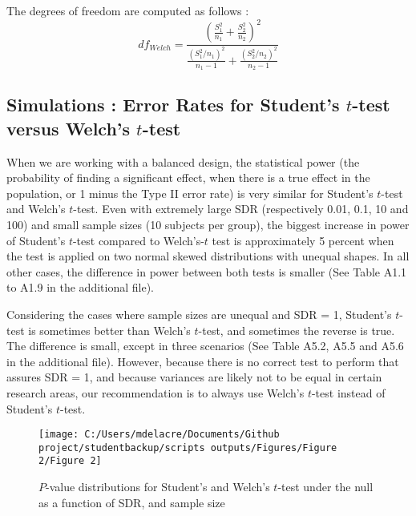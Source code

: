 \documentclass[
  english,
  man]{apa6}
\begin{document}
The degrees of freedom are computed as follows :
\begin{equation*} 
df_{Welch} = \frac{\left(\frac{S^2_1}{n_1}+\frac{S^2_2}{n_2} \right)^2}{\frac{(S^2_1/n_1)^2}{n_1-1}+\frac{(S^2_2/n_2)^2}{n_2-1}}
\label{eqn:dfWelch}
\end{equation*}

\hypertarget{simulations-error-rates-for-students-t-test-versus-welchs-t-test}{%
\subsection{\texorpdfstring{Simulations : Error Rates for Student's \(t\)-test versus Welch's \(t\)-test}{Simulations : Error Rates for Student's t-test versus Welch's t-test}}\label{simulations-error-rates-for-students-t-test-versus-welchs-t-test}}

When we are working with a balanced design, the statistical power (the probability of finding a significant effect, when there is a true effect in the population, or 1 minus the Type II error rate) is very similar for Student's \(t\)-test and Welch's \(t\)-test. Even with extremely large SDR (respectively 0.01, 0.1, 10 and 100) and small sample sizes (10 subjects per group), the biggest increase in power of Student's \(t\)-test compared to Welch's-\(t\) test is approximately 5 percent when the test is applied on two normal skewed distributions with unequal shapes. In all other cases, the difference in power between both tests is smaller (See Table A1.1 to A1.9 in the additional file).

Considering the cases where sample sizes are unequal and SDR = 1, Student's \(t\)-test is sometimes better than Welch's \(t\)-test, and sometimes the reverse is true. The difference is small, except in three scenarios (See Table A5.2, A5.5 and A5.6 in the additional file). However, because there is no correct test to perform that assures SDR = 1, and because variances are likely not to be equal in certain research areas, our recommendation is to always use Welch's \(t\)-test instead of Student's \(t\)-test.

\begin{figure}

{\centering \texttt{[image: C:/Users/mdelacre/Documents/Github project/studentbackup/scripts outputs/Figures/Figure 2/Figure 2]} 

}

\caption{$P$-value distributions for Student's and Welch's $t$-test under the null as a function of SDR, and sample size}\label{fig:chp2fig2}
\end{figure}
\end{document}
